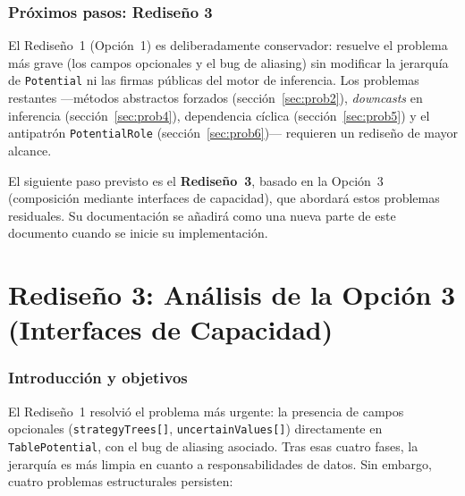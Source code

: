 \documentclass[11pt,a4paper]{article}
\newcommand{\code}[1]{\texttt{#1}}
\begin{document}
\section{Próximos pasos: Rediseño 3}
\label{sec:proximos-pasos}

El Rediseño~1 (Opción~1) es deliberadamente conservador: resuelve el problema
más grave (los campos opcionales y el bug de aliasing) sin modificar la
jerarquía de \code{Potential} ni las firmas públicas del motor de inferencia.
Los problemas restantes ---métodos abstractos forzados
(sección~\ref{sec:prob2}), \emph{downcasts} en inferencia
(sección~\ref{sec:prob4}), dependencia cíclica (sección~\ref{sec:prob5}) y
el antipatrón \code{PotentialRole} (sección~\ref{sec:prob6})--- requieren un
rediseño de mayor alcance.

El siguiente paso previsto es el \textbf{Rediseño~3}, basado en la Opción~3
(composición mediante interfaces de capacidad), que abordará estos problemas
residuales.  Su documentación se añadirá como una nueva parte de este
documento cuando se inicie su implementación.

\newpage
\part{Rediseño 3: Análisis de la Opción 3 (Interfaces de Capacidad)}
\label{part:rediseno3}

\section{Introducción y objetivos}
\label{sec:op3-intro}

El Rediseño~1 resolvió el problema más urgente: la presencia de campos
opcionales (\code{strategyTrees[]}, \code{uncertainValues[]}) directamente en
\code{TablePotential}, con el bug de aliasing asociado.  Tras esas cuatro fases,
la jerarquía es más limpia en cuanto a responsabilidades de datos.  Sin
embargo, cuatro problemas estructurales persisten:
\end{document}
